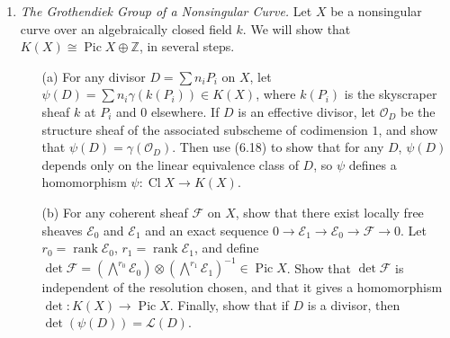 \documentclass{article}
\newcommand{\goth}[1]{\textfrak{#1}}
\newcommand{\fF}{\mathcal{F}}
\newcommand{\fE}{\mathcal{E}}
\newcommand{\fO}{\mathcal{O}}
\newcommand{\fL}{\mathcal{L}}
\newcommand{\Z}{\mathbb{Z}}
\DeclareMathOperator{\rk}{rank}
\DeclareMathOperator{\pic}{Pic}
\DeclareMathOperator{\cl}{Cl}
\DeclareMathOperator{\spec}{Spec}
\begin{document}
\begin{enumerate} [label=\textbf{\arabic*.}, leftmargin=0em]
\begin{proof} $ $ \vspace{0pt}
\begin{itemize} [leftmargin=0cm]
\item[(a)] Suppose $X = \spec{A}$ for some principle ideal domain $A$. Coherent sheaves on $X$ correspond to finitely generated $A$-modules. Any such module can be decomposed as a direct sum of a free and torsion submodule. Any torsion module is a direct sum of $A / \goth{p}$, where $\goth{p}$ is a prime ideal of $A$. Since $A$ is a principle ideal domain, all prime ideals are rank one $A$-modules, so $\gamma(A) = \gamma(\goth{p})$. We have the exact sequence
\begin{equation*}
    0 \to \goth{p} \to A \to A / \goth{p} \to 0,
\end{equation*}
which implies $\gamma(A / \goth{p}) = 0$. Hence, we can identify elements of $K(X)$ to the rank of their free parts.

\item[(b)] Take $\fF = \fO_X^{\oplus n}$ for each $n$, then $\rk \fF = n$.

\item[(c)]

\end{itemize}
\end{proof}

\item \textit{The Grothendiek Group of a Nonsingular Curve.} Let $X$ be a nonsingular curve over an algebraically closed field $k$. We will show that $K(X) \cong \pic X \oplus \Z$, in several steps.
\begin{itemize}
    \item[(a)] For any divisor $D = \sum n_i P_i$ on $X$, let $\psi(D) = \sum n_i \gamma(k(P_i)) \in K(X)$, where $k(P_i)$ is the skyscraper sheaf $k$ at $P_i$ and $0$ elsewhere. If $D$ is an effective divisor, let $\fO_D$ be the structure sheaf of the associated subscheme of codimension $1$, and show that $\psi(D) = \gamma(\fO_D)$. Then use (6.18) to show that for any $D$, $\psi(D)$ depends only on the linear equivalence class of $D$, so $\psi$ defines a homomorphism $\psi : \cl X \to K(X)$.

    \item[(b)] For any coherent sheaf $\fF$ on $X$, show that there exist locally free sheaves $\fE_0$ and $\fE_1$ and an exact sequence $0 \to \fE_1 \to \fE_0 \to \fF \to 0$. Let $r_0 = \rk \fE_0$, $r_1 = \rk \fE_1$, and define $\det \fF = (\bigwedge^{r_0} \fE_0) \otimes (\bigwedge^{r_1} \fE_1)^{-1} \in \pic X$. Show that $\det \fF$ is independent of the resolution chosen, and that it gives a homomorphism $\det : K(X) \to \pic X$. Finally, show that if $D$ is a divisor, then $\det(\psi(D)) = \fL(D)$.


\end{itemize}
\end{enumerate}
\end{document}
